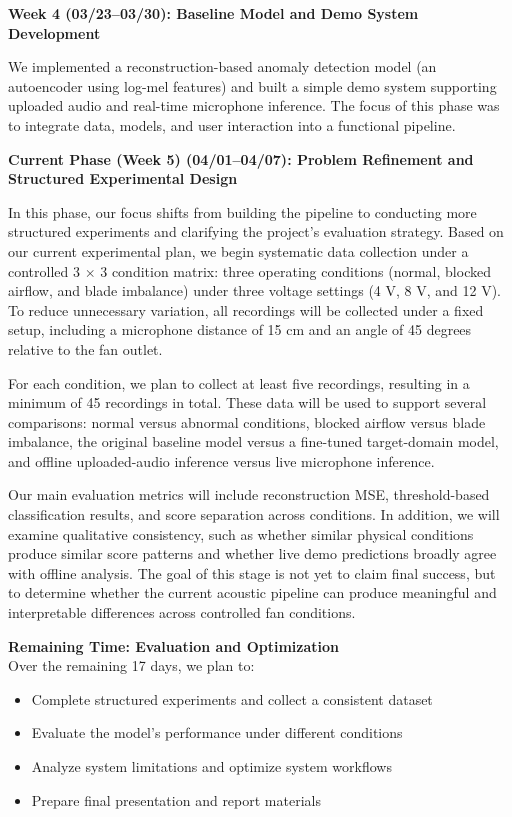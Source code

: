 \documentclass[11pt]{article}
\begin{document}
\noindent\textbf{Week 4 (03/23--03/30): Baseline Model and Demo System Development}

We implemented a reconstruction-based anomaly detection model (an autoencoder using log-mel features) and built a simple demo system supporting uploaded audio and real-time microphone inference. The focus of this phase was to integrate data, models, and user interaction into a functional pipeline.

\noindent\textbf{Current Phase (Week 5) (04/01--04/07): Problem Refinement and Structured Experimental Design}

In this phase, our focus shifts from building the pipeline to conducting more structured experiments and clarifying the project’s evaluation strategy. Based on our current experimental plan, we begin systematic data collection under a controlled 3 $\times$ 3 condition matrix: three operating conditions (normal, blocked airflow, and blade imbalance) under three voltage settings (4 V, 8 V, and 12 V). To reduce unnecessary variation, all recordings will be collected under a fixed setup, including a microphone distance of 15 cm and an angle of 45 degrees relative to the fan outlet.

For each condition, we plan to collect at least five recordings, resulting in a minimum of 45 recordings in total. These data will be used to support several comparisons: normal versus abnormal conditions, blocked airflow versus blade imbalance, the original baseline model versus a fine-tuned target-domain model, and offline uploaded-audio inference versus live microphone inference.

Our main evaluation metrics will include reconstruction MSE, threshold-based classification results, and score separation across conditions. In addition, we will examine qualitative consistency, such as whether similar physical conditions produce similar score patterns and whether live demo predictions broadly agree with offline analysis. The goal of this stage is not yet to claim final success, but to determine whether the current acoustic pipeline can produce meaningful and interpretable differences across controlled fan conditions.

\textbf{Remaining Time: Evaluation and Optimization} \\
Over the remaining 17 days, we plan to:
\begin{itemize}
\item Complete structured experiments and collect a consistent dataset
\item Evaluate the model’s performance under different conditions
\item Analyze system limitations and optimize system workflows
\item Prepare final presentation and report materials
\end{itemize}
\end{document}
